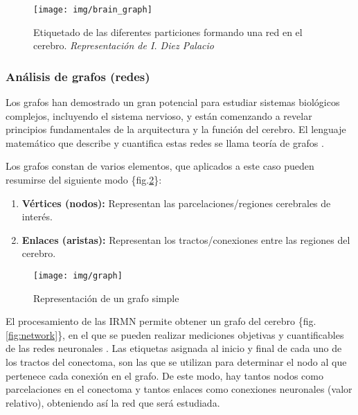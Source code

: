 \documentclass[fleqn,12pt]{UICArticle} %
\begin{document}
\begin{figure}[h]
	\centering
	\texttt{[image: img/brain\_graph]}
	\caption{Etiquetado de las diferentes particiones formando una red en el cerebro. \textit{Representación de I. Diez Palacio}}
	\label{fig:brein_graph}
\end{figure}

\subsubsection{Análisis de grafos (redes)}

Los grafos han demostrado un gran potencial para estudiar sistemas biológicos complejos, incluyendo el sistema nervioso, y están comenzando a revelar principios fundamentales de la arquitectura y la función del cerebro. El lenguaje matemático que describe y cuantifica estas redes se llama teoría de grafos \cite{Mori2002}. 
 
Los grafos constan de varios elementos, que aplicados a este caso pueden resumirse del siguiente modo  \{fig.\ref{fig:graph}\}:
\begin{enumerate}[noitemsep]
\item \textbf{Vértices (nodos):} Representan las parcelaciones/regiones cerebrales de interés.
\item \textbf{Enlaces (aristas):} Representan los tractos/conexiones entre las regiones del cerebro.
\end{enumerate}

\begin{figure}[h]
	\centering
	\texttt{[image: img/graph]}
	\vspace{5mm} 
	\caption{Representación de un grafo simple}
	\label{fig:graph}
\end{figure}

El procesamiento de las IRMN permite obtener un grafo del cerebro \{fig.\ref{fig:network}\}, en el que se pueden realizar mediciones objetivas y cuantificables de las redes neuronales \cite{Mori2002}. Las etiquetas asignada al inicio y final de cada uno de los tractos del conectoma, son las que se utilizan para determinar el nodo al que pertenece cada conexión en el grafo. De este modo, hay tantos nodos como parcelaciones en el conectoma y tantos enlaces como conexiones neuronales (valor relativo), obteniendo así la red que será estudiada.
\end{document}
